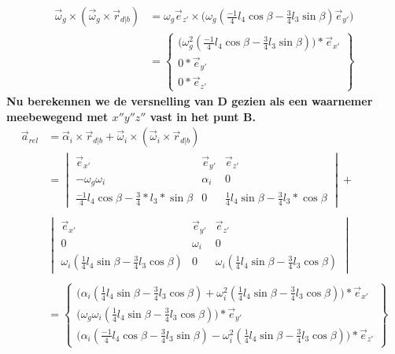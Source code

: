 \documentclass[a4paper,10pt]{article}
\begin{document}
\begin{equation}
	\begin{aligned}
	\vec{\omega}_g \times (\vec{\omega}_g \times \vec{r}_{d|b}) &= \omega_g \vec{e}_{z'} \times \Big(\omega_g (\frac{-1}{4} l_4 \cos{\beta}-\frac{3}{4} l_3 \sin{\beta})\vec{e}_{y'}\Big)\\
	& = \begin{Bmatrix}
	\Big(\omega_{g}^{2} (\frac{-1}{4} l_4 \cos{\beta}-\frac{3}{4} l_3 \sin{\beta})\Big) * \vec{e}_{x'}\\
	0*\vec{e}_{y'}\\
	0*\vec{e}_{z'}
	\end{Bmatrix}
	\end{aligned}
\end{equation}
\textbf{Nu berekennen we de versnelling van D gezien als een waarnemer meebewegend met $x''y''z''$ vast in het punt B.}
\begin{equation}
	\begin{aligned}
	\vec{a}_{rel} &= \vec{\alpha}_i \times \vec{r}_{d|b} + \vec{\omega}_i \times(\vec{\omega}_i \times \vec{r}_{d|b})\\
	&= \begin{vmatrix}
	\vec{e}_{x'} & \vec{e}_{y'} & \vec{e}_{z'}\\
	-\omega_g\omega_i & \alpha_i & 0 \\
	\frac{-1}{4} l_4 \cos{\beta} - \frac{3}{4}*l_3 * \sin{\beta} & 0 &\frac{1}{4} l_4 \sin{\beta}-\frac{3}{4} l_3 * \cos{\beta}
	\end{vmatrix} + \\
	\\
	&\begin{vmatrix}
	\vec{e}_{x'} & \vec{e}_{y'} & \vec{e}_{z'}\\
	0 & \omega_i & 0 \\
	\omega_i (\frac{1}{4} l_4 \sin{\beta}-\frac{3}{4} l_3  \cos{\beta}) & 0 &\omega_i (\frac{1}{4} l_4  \sin{\beta}-\frac{3}{4} l_3   \cos{\beta})
	\end{vmatrix}\\
	\\
	&= \begin{Bmatrix}
	\Big(\alpha_i(\frac{1}{4} l_4  \sin{\beta}-\frac{3}{4} l_3  \cos{\beta}) + \omega_i^2 (\frac{1}{4} l_4  \sin{\beta}-\frac{3}{4} l_3  \cos{\beta})\Big)*\vec{e}_{x'}\\
	\Big(\omega_g\omega_i(\frac{1}{4} l_4  \sin{\beta}-\frac{3}{4} l_3  \cos{\beta})\Big)*\vec{e}_{y'}\\
	\Big(\alpha_i (\frac{-1}{4} l_4 \cos{\beta} - \frac{3}{4} l_3 \sin{\beta}) - \omega_i^2(\frac{1}{4} l_4  \sin{\beta}-\frac{3}{4} l_3 \cos{\beta})\Big)*\vec{e}_{z'}
	\end{Bmatrix}
	\end{aligned}
\end{equation}
\end{document}
